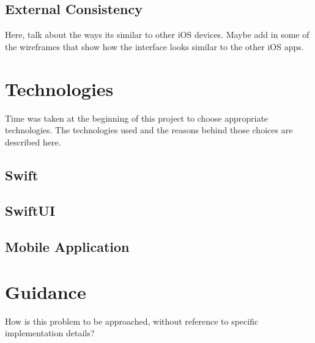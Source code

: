 \documentclass{l4proj}
\begin{document}
\subsection{External Consistency}
Here, talk about the ways its similar to other iOS devices. Maybe add in some of the wireframes that show how the interface looks 
similar to the other iOS apps. 

\section{Technologies}
Time was taken at the beginning of this project to choose appropriate technologies. The technologies used and the reasons behind those 
choices are described here.

\subsection{Swift}
\subsection{SwiftUI}
\subsection{Mobile Application}

\section{Guidance}
How is this problem to be approached, without reference to specific implementation details? 
\end{document}

